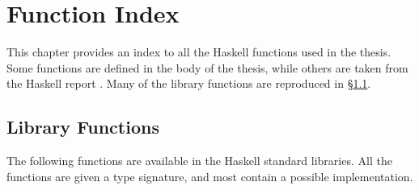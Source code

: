 
\chapter{Function Index}
\label{chp:index}

This chapter provides an index to all the Haskell functions used in the thesis. Some functions are defined in the body of the thesis, while others are taken from the Haskell report \cite{haskell}. Many of the library functions are reproduced in \S\ref{secI:library}.

\renewenvironment{theindex}
    {\thispagestyle{plain}\parindent\z@@
     \parskip\z@@ \@@plus .3\p@@\relax
     \columnseprule \z@@
     \columnsep 35\p@@
     \let\item\@@idxitem}
    {}

\begin{multicols}{2}
\printindex
\end{multicols}


\section{Library Functions}
\label{secI:library}

The following functions are available in the Haskell standard libraries. All the functions are given a type signature, and most contain a possible implementation.

\begin{comment}
\begin{code}
import Prelude(Char,Show,Eq(..),Int,Num(..),Ord(..),otherwise,repeat,Read,Bool(..))
data IO a = IO a
instance Monad IO
\end{code}
\end{comment}



